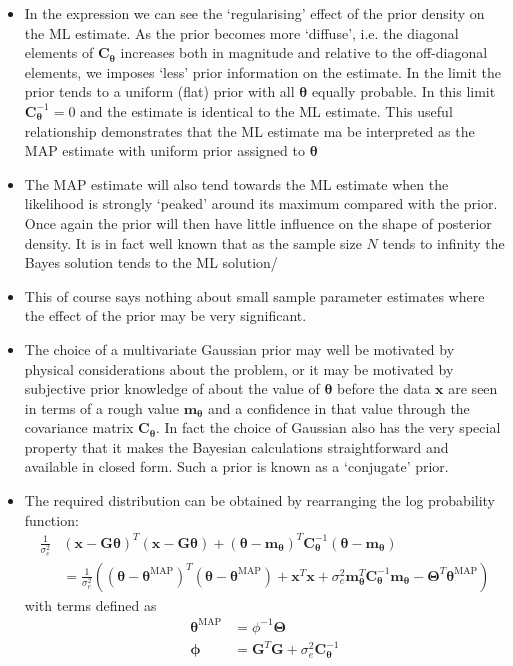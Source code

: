 \documentclass[12pt]{article}
\newcommand{\sigd}{\sigma^2}
\newcommand{\thetab}{\boldsymbol{\theta}}
\newcommand{\Thetab}{\boldsymbol{\Theta}}
\newcommand{\xb}{\mathbf{x}}
\newcommand{\Gb}{\mathbf{G}}
\newcommand{\map}{\textrm{MAP}}
\newcommand{\thetamap}{\thetab^\map}
\newcommand{\mb}{\mathbf{m}}
\newcommand{\cb}{\mathbf{C}}
\newcommand{\mbt}{\mb_{\thetab}}
\newcommand{\cbt}{\cb_{\thetab}}
\begin{document}
\begin{itemize}
    \item In the expression we can see the `regularising' effect of the prior density on the ML estimate. As the prior becomes more `diffuse', i.e. the diagonal elements of $\cbt$ increases both in magnitude and relative to the off-diagonal elements, we imposes `less' prior information on the estimate. In the limit the prior tends to a uniform (flat) prior with all $\thetab$ equally probable. In this limit $\cbt^{-1} = 0$ and the estimate is identical to the ML estimate. This useful relationship demonstrates that the ML estimate ma be interpreted as the MAP estimate with uniform prior assigned to $\thetab$
    \item The MAP estimate will also tend towards the ML estimate when the likelihood is strongly `peaked' around its maximum compared with the prior. Once again the prior will then have little influence on the shape of posterior density. It is in fact well known that as the sample size $N$ tends to infinity the Bayes solution tends to the ML solution/
    \item This of course says nothing about small sample parameter estimates where the effect of the prior may be very significant.
    \item The choice of a multivariate Gaussian prior may well be motivated by physical considerations about the problem, or it may be motivated by subjective prior knowledge of about the value of $\thetab$ before the data $\xb$ are seen in terms of a rough value $\mbt$ and a confidence in that value through the covariance matrix $\cbt$. In fact the choice of Gaussian also has the very special property that it makes the Bayesian calculations straightforward and available in closed form. Such a prior is known as a `conjugate' prior.
    \item The required distribution can be obtained by rearranging the log probability function:
    \begin{align}
        \frac{1}{\sigd_e}&(\xb - \Gb \thetab)^T (\xb - \Gb \thetab) + (\thetab - \mbt)^T \cbt^{-1} (\thetab - \mbt) \\
        &= \frac{1}{\sigd_e}\left( (\thetab - \thetamap)^T(\thetab - \thetamap) + \xb^T\xb + \sigd_e \mbt^T\cbt^{-1}\mbt - \Thetab^T\thetamap \right)
    \end{align}
     with terms defined as 
     \begin{align*}
         \thetamap & = \phi^{-1}\Thetab \\
         \boldsymbol{\phi} &= \Gb^T\Gb + \sigd_e \cbt^{-1}\\

\end{align*}
\end{itemize}
\end{document}
